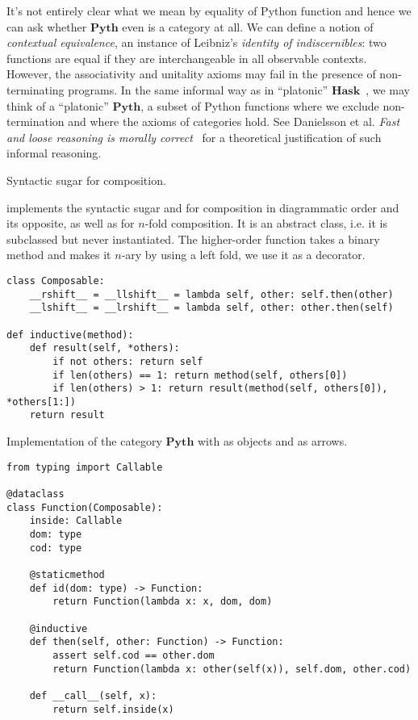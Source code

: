 \begin{remark}\label{remark:category-Pyth}
It's not entirely clear what we mean by equality of Python function and hence we can ask whether $\mathbf{Pyth}$ even is a category at all.
We can define a notion of \emph{contextual equivalence}, an instance of Leibniz's \emph{identity of indiscernibles}: two functions are equal if they are interchangeable in all observable contexts.
However, the associativity and unitality axioms may fail in the presence of non-terminating programs.
In the same informal way as in ``platonic'' $\mathbf{Hask}$~\cite{HaskellWikiContributors12}, we may think of a ``platonic'' $\mathbf{Pyth}$, a subset of Python functions where we exclude non-termination and where the axioms of categories hold.
See Danielsson et al. \emph{Fast and loose reasoning is morally correct}~\cite{DanielssonEtAl06} for a theoretical justification of such informal reasoning.
\end{remark}

\begin{python}
{\normalfont Syntactic sugar for composition.}

 implements the syntactic sugar \py{>>} and \py{<<} for composition in diagrammatic order and its opposite, as well as  for $n$-fold composition.
It is an abstract class, i.e. it is subclassed but never instantiated.
The higher-order function  takes a binary method and makes it $n$-ary by using a left fold, we use it as a decorator.

\begin{verbatim}
class Composable:
    __rshift__ = __llshift__ = lambda self, other: self.then(other)
    __lshift__ = __lrshift__ = lambda self, other: other.then(self)

def inductive(method):
    def result(self, *others):
        if not others: return self
        if len(others) == 1: return method(self, others[0])
        if len(others) > 1: return result(method(self, others[0]), *others[1:])
    return result
\end{verbatim}
\end{python}

\begin{python}\label{listing:Function}
{\normalfont Implementation of the category $\mathbf{Pyth}$ with  as objects and  as arrows.}

\begin{verbatim}
from typing import Callable

@dataclass
class Function(Composable):
    inside: Callable
    dom: type
    cod: type

    @staticmethod
    def id(dom: type) -> Function:
        return Function(lambda x: x, dom, dom)

    @inductive
    def then(self, other: Function) -> Function:
        assert self.cod == other.dom
        return Function(lambda x: other(self(x)), self.dom, other.cod)

    def __call__(self, x):
        return self.inside(x)
\end{verbatim}
\end{python}


